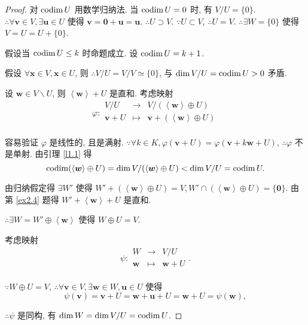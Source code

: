\documentclass[color=black,device=normal,lang=cn,mode=geye]{elegantnote}
\begin{document}
\begin{proof}
    对 $\operatorname{codim} U$ 用数学归纳法. 当 $\operatorname{codim} U=0$ 时, 有 $V/U=\{0\}$. $\therefore\forall\boldsymbol{v}\in V,\exists\boldsymbol{u}\in U$ 使得 $\boldsymbol{v}=\boldsymbol{0}+\boldsymbol{u}=\boldsymbol{u}$. $\therefore U\supset V$. $\because U\subset V$, $\therefore U=V$. $\therefore\exists W=\{0\}$ 使得 $V=U=U+\{0\}$.

    假设当 $\operatorname{codim} U\leq k$ 时命题成立. 设 $\operatorname{codim} U=k+1$.

    假设 $\forall\boldsymbol{x}\in V,\boldsymbol{x}\in U$, 则 $\therefore V/U=V/V\simeq\{0\}$, 与 $\dim V/U=\operatorname{codim} U>0$ 矛盾.

    设 $\boldsymbol{w}\in V\backslash U$, 则 $\left<\boldsymbol{w}\right>+U$ 是直和. 考虑映射
    \[\varphi:\begin{array}{rcl}
        V/U & \to & V/(\left<\boldsymbol{w}\right>\oplus U) \\
        \boldsymbol{v}+U & \mapsto & \boldsymbol{v}+(\left<\boldsymbol{w}\right>\oplus U) \\
    \end{array}\]

    容易验证 $\varphi$ 是线性的, 且是满射. $\because\forall k\in K,\varphi(\boldsymbol{v}+U)=\varphi(\boldsymbol{v}+k\boldsymbol{w}+U)$, $\therefore\varphi$ 不是单射. 由引理 \ref{l1.1} 得
    \[\operatorname{codim}(\left<\boldsymbol{w}\right>\oplus U)=\dim V/(\left<\boldsymbol{w}\right>\oplus U)<\dim V/U=\operatorname{codim} U.\]

    由归纳假定得 $\exists W'$ 使得 $W'+(\left<\boldsymbol{w}\right>\oplus U)=V,W'\cap(\left<\boldsymbol{w}\right>\oplus U)=\{\boldsymbol{0}\}$. 由第 \ref{ex2.4} 题得 $W'+\left<\boldsymbol{w}\right>+U$ 是直和.
    
    $\therefore\exists W=W'\oplus\left<\boldsymbol{w}\right>$ 使得 $W\oplus U=V$.

    考虑映射
    \[\psi:\begin{array}{rcl}
        W & \to & V/U \\
        \boldsymbol{w} & \mapsto & \boldsymbol{w}+U \\
    \end{array}.\]

    $\because W\oplus U=V$, $\therefore\forall\boldsymbol{v}\in V,\exists\boldsymbol{w}\in W,\boldsymbol{u}\in U$ 使得
    \[\psi(\boldsymbol{v})=\boldsymbol{v}+U=\boldsymbol{w}+\boldsymbol{u}+U=\boldsymbol{w}+U=\psi(\boldsymbol{w}),\]

    $\therefore\psi$ 是同构, 有 $\dim W=\dim V/U=\operatorname{codim} U$.
\end{proof}
\end{document}
